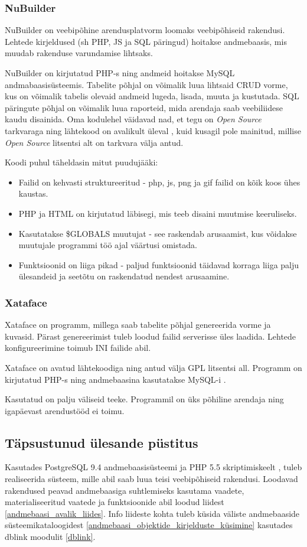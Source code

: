\documentclass[a4paper,12pt]{article} %
\begin{document}
\subsubsection{NuBuilder}
NuBuilder on veebipõhine arendusplatvorm loomaks veebipõhiseid rakendusi. Lehtede kirjeldused (sh PHP, JS ja SQL päringud) hoitakse andmebaasis, mis muudab rakenduse varundamise lihtsaks.\par
NuBuilder on kirjutatud PHP-s ning andmeid hoitakse MySQL andmabaasisüsteemis. Tabelite põhjal on võimalik luua lihtsaid CRUD vorme, kus on võimalik tabelis olevaid andmeid lugeda, lisada, muuta ja kustutada. SQL päringute põhjal on võimalik luua raporteid, mida arendaja saab veebiliidese kaudu disainida.
Oma kodulehel väidavad nad, et tegu on \textit{Open Source} tarkvaraga ning lähtekood on avalikult üleval \cite{nuBuilderGitHub}, kuid kusagil pole mainitud, millise \textit{Open Source} litsentsi alt on tarkvara välja antud.\par
Koodi puhul täheldasin mitut puudujääki:
\begin{itemize}
\item Failid on kehvasti struktureeritud - php, js, png ja gif failid on kõik koos ühes kaustas.
\item PHP ja HTML on kirjutatud läbisegi, mis teeb disaini muutmise keeruliseks.
\item Kasutatakse \$GLOBALS muutujat - see raskendab arusaamist, kus võidakse muutujale programmi töö ajal väärtusi omistada.
\item Funktsioonid on liiga pikad - paljud funktsioonid täidavad korraga liiga palju ülesandeid ja seetõtu on raskendatud nendest arusaamine.
\end{itemize}
\cite{nuBuilder}
\subsubsection{Xataface}
Xataface on programm, millega saab tabelite põhjal genereerida vorme ja kuvasid. Pärast genereerimist tuleb loodud failid serverisse üles laadida. Lehtede konfigureerimine toimub INI failide abil.\cite{Xataface}\par
Xataface on avatud lähtekoodiga ning antud välja GPL litsentsi all. Programm on kirjutatud PHP-s \cite{PHP} ning andmebaasina kasutatakse MySQL-i \cite{MySQL}.\par
Kasutatud on palju väliseid teeke. Programmil on üks põhiline arendaja ning igapäevast arendustööd ei toimu. \cite{XatafaceGitHub}
\subsection{Täpsustunud ülesande püstitus}
Kasutades PostgreSQL 9.4 andmebaasisüsteemi \cite{PostgreSQL} ja PHP 5.5 skriptimiskeelt \cite{PHP}, tuleb realiseerida süsteem, mille abil saab luua teisi veebipõhiseid rakendusi. Loodavad rakendused peavad andmebaasiga suhtlemiseks kasutama vaadete, materialiseeritud vaatede ja funktsioonide abil loodud liidest \ref{andmebaasi_avalik_liides}. Info liideste kohta tuleb küsida väliste andmebaaside süsteemikataloogidest \ref{andmebaasi_objektide_kirjelduste_küsimine} kasutades dblink moodulit \ref{dblink}.
\end{document}
